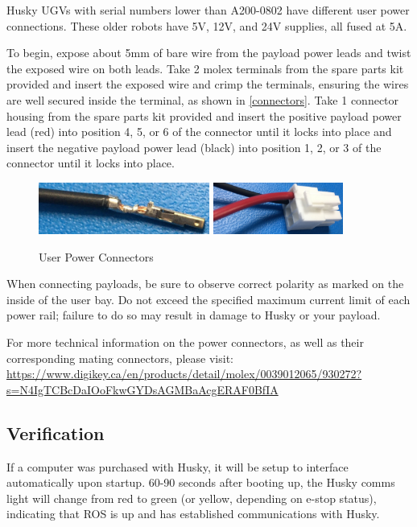 \documentclass[]{clearpath-latex/clearpath-manual}
\begin{document}
Husky UGVs with serial numbers lower than A200-0802 have different user power connections.  These older robots have
5V, 12V, and 24V supplies, all fused at 5A.

To begin, expose about 5mm of bare wire from the payload power leads and twist the exposed wire on both leads.  Take 2 molex terminals from the spare parts kit provided and insert the exposed wire and crimp the terminals, ensuring the wires are well secured inside the terminal, as shown in \autoref{connectors}. Take 1 connector housing from the spare parts kit provided and insert the positive payload power lead (red) into position 4, 5, or 6 of the connector until it locks into place and insert the negative payload power lead (black) into position 1, 2, or 3 of the connector until it locks into place.

\begin{figure}[h]
	\centering
	\includegraphics[width=0.5\textwidth]{graphics/updated-power-connector-1.jpg}
	\includegraphics[width=0.38\textwidth]{graphics/updated-power-connector-2.jpg}
	\caption{User Power Connectors}
	\label{connectors}
\end{figure}

When connecting payloads, be sure to observe correct polarity as marked on the inside of the user bay.
Do not exceed the specified maximum current limit of each power rail; failure to do so may result in damage
to Husky or your payload.

For more technical information on the power connectors, as well as their corresponding mating connectors, please visit: \url{https://www.digikey.ca/en/products/detail/molex/0039012065/930272?s=N4IgTCBcDaIOoFkwGYDsAGMBaAcgERAF0BfIA}

\subsection{Verification}
If a computer was purchased with Husky, it will be setup to interface automatically upon startup.
60-90 seconds after booting up, the Husky comms light will change from red to green
(or yellow, depending on e-stop status), indicating that ROS is up and has established communications with Husky.
\end{document}
